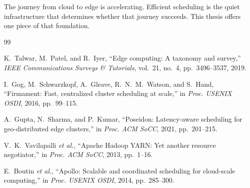 \documentclass[12pt,letterpaper,twoside]{report}
\begin{document}
The journey from cloud to edge is accelerating. Efficient scheduling is the quiet infrastructure that determines whether that journey succeeds. This thesis offers one piece of that foundation.

\begin{thebibliography}{99}

K.~Talwar, M.~Patel, and R.~Iyer,
``Edge computing: A taxonomy and survey,''
\textit{IEEE Communications Surveys \& Tutorials}, vol.~21, no.~4, pp.~3496--3537, 2019.

I.~Gog, M.~Schwarzkopf, A.~Gleave, R.~N.~M.~Watson, and S.~Hand,
``Firmament: Fast, centralized cluster scheduling at scale,''
in \textit{Proc. USENIX OSDI}, 2016, pp.~99--115.

A.~Gupta, N.~Sharma, and P.~Kumar,
``Poseidon: Latency-aware scheduling for geo-distributed edge clusters,''
in \textit{Proc. ACM SoCC}, 2021, pp.~201--215.

V.~K.~Vavilapalli \textit{et al.},
``Apache Hadoop YARN: Yet another resource negotiator,''
in \textit{Proc. ACM SoCC}, 2013, pp.~1--16.

E.~Boutin \textit{et al.},
``Apollo: Scalable and coordinated scheduling for cloud-scale computing,''
in \textit{Proc. USENIX OSDI}, 2014, pp.~285--300.

\end{thebibliography}
\end{document}
